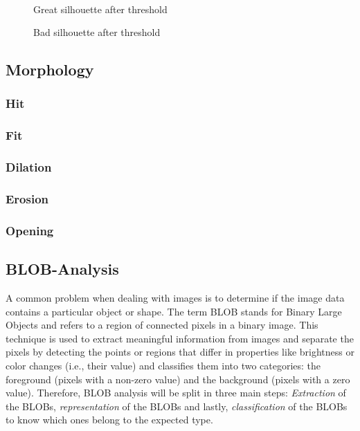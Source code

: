 \begin{figure}[htbp]
\begin{minipage}[b]{0.45\textwidth}
\end{minipage} \\ %
\begin{minipage}[t]{0.45\textwidth}
\caption{Great silhouette after threshold} %
\label{fig:SimpleThresholdAfter}
\end{minipage} \hfill
\begin{minipage}[t]{0.45\textwidth}
\caption{Bad silhouette after threshold} %
\label{fig:ComplicatedThresholdAfter}
\end{minipage}
\end{figure}
 
 
 
\subsection{Morphology}
\subsubsection{Hit}
\subsubsection{Fit}
\subsubsection{Dilation}
\subsubsection{Erosion}
\subsubsection{Opening}
\subsection{BLOB-Analysis}
A common problem when dealing with images is to determine if the image data contains a particular object or shape. The term BLOB stands for Binary Large Objects and refers to a region of connected pixels in a binary image. This technique is used to extract meaningful information from images and separate the pixels by detecting the points or regions that differ in properties like brightness or color changes (i.e., their value) and classifies them into two categories: the foreground (pixels with a non-zero value) and the background (pixels with a zero value).
Therefore, BLOB analysis will be split in three main steps: \textit{Extraction} of the BLOBs, \textit{representation} of the BLOBs and lastly, \textit{classification} of the BLOBs to know which ones belong to the expected type.
